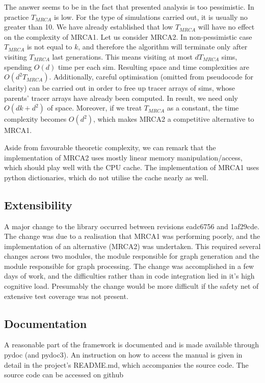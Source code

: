 \documentclass{l4proj}
\begin{document}
The answer seems to be in the fact that presented analysis is too pessimistic. In practice $T_{MRCA}$ is low. For the type of simulations carried out, it is usually no greater than 10. We have already established that low $T_{MRCA}$ will have no effect on the complexity of \textsc{MRCA1}. Let us consider \textsc{MRCA2}. In non-pessimistic case $T_{MRCA}$ is not equal to $k$, and therefore the algorithm will terminate only after visiting $T_{MRCA}$ last generations. This means visiting at most $dT_{MRCA}$ sims, spending $O(d)$ time per each sim. Resulting space and time complexities are $O(d^{2}T_{MRCA})$. Additionally, careful optimisation (omitted from pseudocode for clarity) can be carried out in order to free up tracer arrays of sims, whose parents' tracer arrays have already been computed. In result, we need only $O(dk + d^{2})$ of space. Moreover, if we treat $T_{MRCA}$ as a constant, the time complexity becomes $O(d^{2})$, which makes \textsc{MRCA2} a competitive alternative to \textsc{MRCA1}.

Aside from favourable theoretic complexity, we can remark that the implementation of \textsc{MRCA2} uses mostly linear memory manipulation/access, which should play well with the CPU cache. The implementation of \textsc{MRCA1} uses python dictionaries, which do not utilise the cache nearly as well.

\subsection{Extensibility}

A major change to the library occurred between revisions eadc6756 and 1af29cde. The change was due to a realisation that MRCA1 was performing poorly, and the implementation of an alternative (MRCA2) was undertaken. This required several changes across two modules, the module responsible for graph generation and the module responsible for graph processing. The change was accomplished in a few days of work, and the difficulties rather than in code integration lied in it's high cognitive load. Presumably the change would be more difficult if the safety net of extensive test coverage was not present.  

\subsection{Documentation}
A reasonable part of the framework is documented and is made available through pydoc (and pydoc3). An instruction on how to access the manual is given in detail in the project's README.md, which accompanies the source code. The source code can be accessed on github \parencite{Kurkiewicz16}
\end{document}
